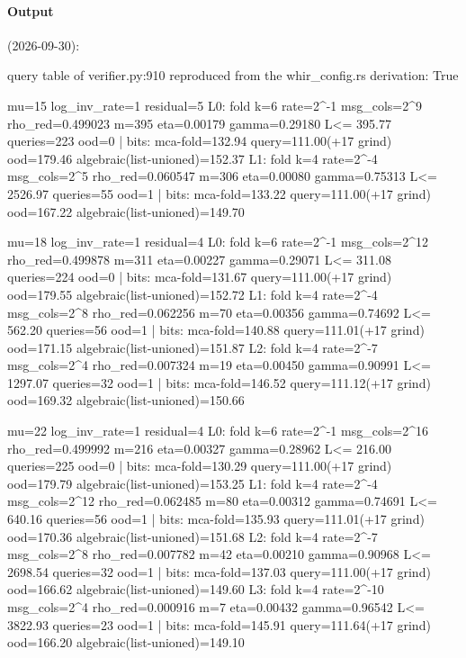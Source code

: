 \paragraph{Output} (2026-09-30):
\begin{shellcode}
query table of verifier.py:910 reproduced from the whir_config.rs derivation: True

mu=15 log_inv_rate=1 residual=5
  L0: fold k=6 rate=2^-1 msg_cols=2^9 rho_red=0.499023 m=395 eta=0.00179 gamma=0.29180 L<= 395.77 queries=223 ood=0 | bits: mca-fold=132.94 query=111.00(+17 grind) ood=179.46 algebraic(list-unioned)=152.37
  L1: fold k=4 rate=2^-4 msg_cols=2^5 rho_red=0.060547 m=306 eta=0.00080 gamma=0.75313 L<= 2526.97 queries=55 ood=1 | bits: mca-fold=133.22 query=111.00(+17 grind) ood=167.22 algebraic(list-unioned)=149.70

mu=18 log_inv_rate=1 residual=4
  L0: fold k=6 rate=2^-1 msg_cols=2^12 rho_red=0.499878 m=311 eta=0.00227 gamma=0.29071 L<= 311.08 queries=224 ood=0 | bits: mca-fold=131.67 query=111.00(+17 grind) ood=179.55 algebraic(list-unioned)=152.72
  L1: fold k=4 rate=2^-4 msg_cols=2^8 rho_red=0.062256 m=70 eta=0.00356 gamma=0.74692 L<= 562.20 queries=56 ood=1 | bits: mca-fold=140.88 query=111.01(+17 grind) ood=171.15 algebraic(list-unioned)=151.87
  L2: fold k=4 rate=2^-7 msg_cols=2^4 rho_red=0.007324 m=19 eta=0.00450 gamma=0.90991 L<= 1297.07 queries=32 ood=1 | bits: mca-fold=146.52 query=111.12(+17 grind) ood=169.32 algebraic(list-unioned)=150.66

mu=22 log_inv_rate=1 residual=4
  L0: fold k=6 rate=2^-1 msg_cols=2^16 rho_red=0.499992 m=216 eta=0.00327 gamma=0.28962 L<= 216.00 queries=225 ood=0 | bits: mca-fold=130.29 query=111.00(+17 grind) ood=179.79 algebraic(list-unioned)=153.25
  L1: fold k=4 rate=2^-4 msg_cols=2^12 rho_red=0.062485 m=80 eta=0.00312 gamma=0.74691 L<= 640.16 queries=56 ood=1 | bits: mca-fold=135.93 query=111.01(+17 grind) ood=170.36 algebraic(list-unioned)=151.68
  L2: fold k=4 rate=2^-7 msg_cols=2^8 rho_red=0.007782 m=42 eta=0.00210 gamma=0.90968 L<= 2698.54 queries=32 ood=1 | bits: mca-fold=137.03 query=111.00(+17 grind) ood=166.62 algebraic(list-unioned)=149.60
  L3: fold k=4 rate=2^-10 msg_cols=2^4 rho_red=0.000916 m=7 eta=0.00432 gamma=0.96542 L<= 3822.93 queries=23 ood=1 | bits: mca-fold=145.91 query=111.64(+17 grind) ood=166.20 algebraic(list-unioned)=149.10


\end{shellcode}

